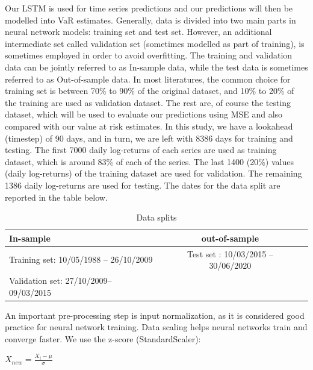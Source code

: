 \documentclass[a4paper,11pt,oneside]{book}
\begin{document}
Our LSTM is used for time series predictions and our predictions will then be modelled into VaR estimates. Generally, data is divided into two main parts in neural network models: training set and test set. However, an additional intermediate set called validation set (sometimes modelled as part of training), is sometimes employed in order to avoid overfitting. The training and validation data can be jointly referred to as In-sample data, while the test data is sometimes referred to as Out-of-sample data. In most literatures, the common choice for training set is between 70\% to 90\% of the original dataset, and 10\% to 20\% of the training are used as validation dataset. The rest are, of course the testing dataset, which will be used to evaluate our predictions using MSE and also compared with our value at risk estimates. \newline\newline
In this study, we have a lookahead (timestep) of 90 days, and in turn, we are left with 8386 days for training and testing. The first 7000 daily log-returns of each series are used as training dataset, which is around 83\% of each of the series. The last 1400 (20\%) values (daily log-returns) of the training dataset are used for validation. The remaining 1386 daily log-returns are used for testing. The dates for the data split are reported in the table below.
\newline\newline
\begin{table}[!h]
	\centering
	\begin{tabular}{l|cl}
		\hline \hline
		In-sample
		& out-of-sample\\ \hline
		Training set: 10/05/1988 – 26/10/2009
		& Test set
		: 10/03/2015 – 30/06/2020
	 \\
		Validation set: 27/10/2009– 09/03/2015
		\\
		\hline \hline
	\end{tabular}
	\caption{Data splits}
	\label{firsttab}
\end{table}

An important pre-processing step is input normalization, as it is considered good practice for neural network training. Data scaling helps neural networks train and converge faster. We use the z-score (StandardScaler): 

\begin{center}
	$X_{new} = \frac{X_{i}-\mu}{\sigma}$
\end{center}
\end{document}
